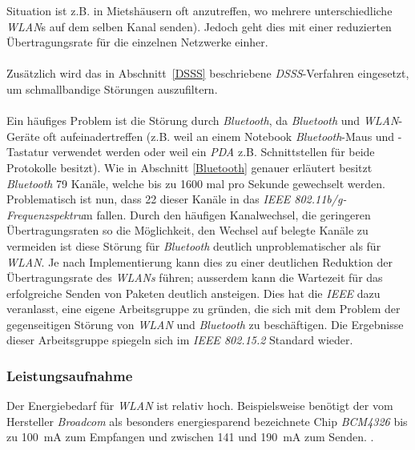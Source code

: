             Situation ist z.B. in Mietshäusern oft anzutreffen, wo mehrere 
            unterschiedliche \emph{WLAN}s auf dem selben Kanal senden). Jedoch geht dies
            mit einer reduzierten Übertragungsrate für die einzelnen Netzwerke
            einher.\\
            \\
            Zusätzlich wird das in Abschnitt~\ref{DSSS} beschriebene \emph{DSSS}-Verfahren
            eingesetzt, um schmallbandige Störungen auszufiltern. \\
            \\
            Ein häufiges Problem ist die Störung durch \emph{Bluetooth}, da 
            \emph{Bluetooth} und \emph{WLAN}-Geräte oft aufeinadertreffen (z.B. weil an einem
            Notebook \emph{Bluetooth}-Maus und -Tastatur verwendet werden oder weil 
            ein \emph{PDA} z.B. Schnittstellen für beide Protokolle besitzt).
            Wie in Abschnitt \ref{Bluetooth} genauer erläutert besitzt \emph{Bluetooth}
            79 Kanäle, welche bis zu 1600 mal pro Sekunde gewechselt werden.
            Problematisch ist nun, dass 22 dieser Kanäle in das 
            \emph{IEEE 802.11b/g-Frequenzspektru}m fallen. Durch den häufigen
            Kanalwechsel, die geringeren Übertragungsraten so die 
            Möglichkeit, den Wechsel auf belegte Kanäle zu vermeiden ist diese
            Störung für \emph{Bluetooth} deutlich unproblematischer als für \emph{WLAN}.
            Je nach Implementierung kann dies zu einer deutlichen Reduktion
            der Übertragungsrate des \emph{WLANs} führen; ausserdem kann die Wartezeit
            für das erfolgreiche Senden von Paketen deutlich ansteigen.
            Dies hat die \emph{IEEE} dazu veranlasst, eine eigene Arbeitsgruppe
            zu gründen, die sich mit dem Problem der gegenseitigen Störung
            von \emph{WLAN} und \emph{Bluetooth} zu beschäftigen. Die Ergebnisse dieser
            Arbeitsgruppe spiegeln sich im \emph{IEEE 802.15.2} Standard wieder.

        \subsubsection{Leistungsaufnahme}
            Der Energiebedarf für \emph{WLAN} ist relativ hoch. Beispielsweise benötigt der
            vom Hersteller \emph{Broadcom} als besonders energiesparend bezeichnete Chip
            \emph{BCM4326} bis zu 100~mA zum Empfangen und zwischen 141 und 190~mA zum Senden.
            \cite{BCM4326_Datasheet}. 

